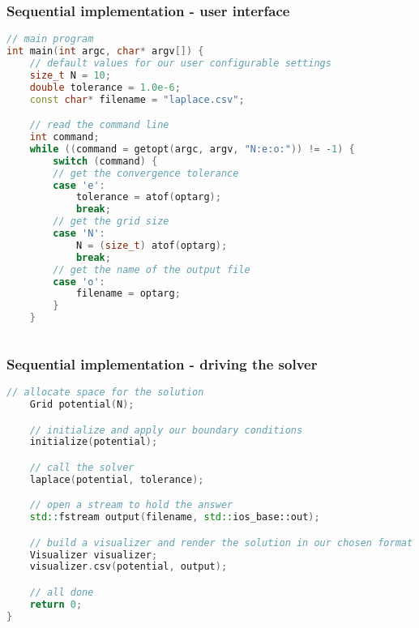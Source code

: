 %
%


\begin{frame}[fragile]
%
  \frametitle{Sequential implementation - user interface}
%
  \begin{lstlisting}[language=c++,name=seq:frame,firstnumber=77]
// main program
int main(int argc, char* argv[]) {
    // default values for our user configurable settings
    size_t N = 10;
    double tolerance = 1.0e-6;
    const char* filename = "laplace.csv";

    // read the command line
    int command;
    while ((command = getopt(argc, argv, "N:e:o:")) != -1) {
        switch (command) {
        // get the convergence tolerance
        case 'e':
            tolerance = atof(optarg);
            break;
        // get the grid size
        case 'N':
            N = (size_t) atof(optarg);
            break;
        // get the name of the output file
        case 'o':
            filename = optarg;
        }
    }
    
  \end{lstlisting}
% 
\end{frame}

\begin{frame}[fragile]
%
  \frametitle{Sequential implementation - driving the solver}
%
  \begin{lstlisting}[language=c++,name=seq:frame]
    // allocate space for the solution
    Grid potential(N);

    // initialize and apply our boundary conditions
    initialize(potential);

    // call the solver
    laplace(potential, tolerance);

    // open a stream to hold the answer
    std::fstream output(filename, std::ios_base::out);

    // build a visualizer and render the solution in our chosen format
    Visualizer visualizer;
    visualizer.csv(potential, output);

    // all done
    return 0;
}
  \end{lstlisting}
% 
\end{frame}

